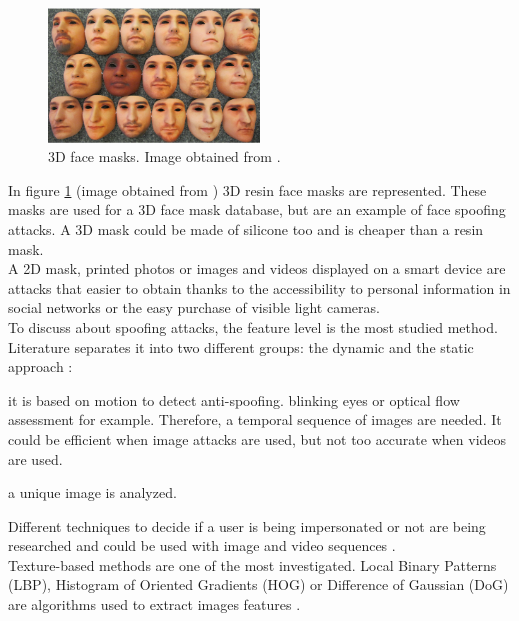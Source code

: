 \begin{figure}[htb]
\centering
\includegraphics[width=0.5\textwidth]{images_miscelaneus/fig_masks.png}
\caption{3D face masks. Image obtained from \cite{3dmask}.} \label{fig:3dMasks}
\end{figure}

In figure \ref{fig:3dMasks} (image obtained from \cite{3dmask}) 3D resin face masks  are represented. These masks are used for a 3D face mask database, but are an example of face spoofing attacks. A 3D mask could be made of silicone too and is cheaper than a resin mask.\\

A 2D mask, printed photos or images and videos displayed on a smart device are attacks that easier to obtain thanks to the accessibility to personal information in social networks or the easy purchase of visible light cameras.\\


To discuss about spoofing attacks, the feature level is the most studied method. Literature separates it into two different groups: the dynamic and the static approach \cite{Spoofing_survey}:
\begin{description}[itemsep=2pt,topsep=8pt,parsep=0pt,partopsep=20pt]
\item[Dynamic:] it is based on motion to detect anti-spoofing. blinking eyes or optical flow assessment for example. Therefore, a temporal sequence of images are needed. It could be efficient when image attacks are used, but not too accurate when videos are used.
\item[Static:] a unique image is analyzed.
\end{description}

Different techniques to decide if a user is being impersonated or not are being researched and could be used with image and video sequences \cite{Spoofing_survey}.\\

Texture-based methods are one of the most investigated. Local Binary Patterns (LBP),  Histogram of Oriented Gradients (HOG) or Difference of Gaussian (DoG) are algorithms used to extract images features \cite{distorsion,Spoofing_survey}.\\

